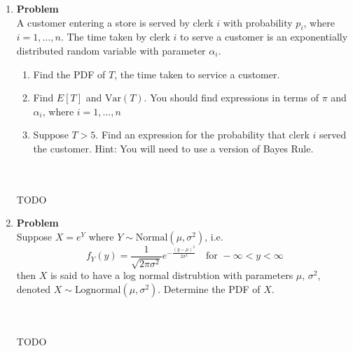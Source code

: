 \documentclass[12pt]{article}
\newenvironment{Ex}{\textbf{Problem}\vspace{.75em}\\}{}
\begin{document}
\begin{enumerate}
\begin{Ex}
    \begin{enumerate}
    \item Find the joint PDF of $Y$ and $X$.
    \item Find the marginal PDF of $Y$.
    \item Find $E[Y]$.
    \end{enumerate}
    \begin{solution} \hfill \\\\ {\huge TODO}
    \end{solution}
  \end{Ex}
\item
  \begin{Ex}
    A customer entering a store is served by clerk $i$ with
    probability $p_i$, where $i = 1,\ldots,n$. The time taken by clerk
    $i$ to serve a customer is an exponentially distributed random
    variable with parameter $\alpha_i$.
    \begin{enumerate}
    \item Find the PDF of $T$, the time taken to service a customer.
    \item Find $E[T]$ and $\text{Var}(T)$. You should find expressions
      in terms of $\pi$ and $\alpha_i$, where $i = 1,\ldots,n$
    \item Suppose $T > 5$. Find an expression for the probability that
      clerk $i$ served the customer. Hint: You will need to use a
      version of Bayes Rule.
    \end{enumerate}
    \begin{solution} \hfill \\\\ {\huge TODO}
    \end{solution}
  \end{Ex}
\item
  \begin{Ex}
    Suppose $X = e^Y$ where $Y\sim \text{Normal}(\mu, \sigma^2)$, i.e.
    \begin{equation}
      \label{eq:5-question}
      f_Y(y) =
      \frac{1}{\sqrt{2\pi\sigma^2}}e^{-\frac{(y-\mu)^2}{2\sigma^2}}
      \quad\text{for }-\infty < y < \infty
    \end{equation}
    then $X$ is said to have a log normal distrubtion with parameters
    $\mu$, $\sigma^2$, denoted $X \sim
    \text{Lognormal}(\mu,\sigma^2)$. Determine the PDF of $X$.
    \begin{solution} \hfill \\\\ {\huge TODO}

\end{solution}
\end{Ex}
\end{enumerate}
\end{document}

